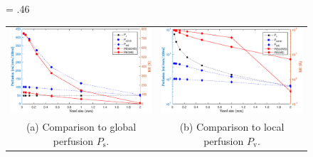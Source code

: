 \documentclass[final,5p,times,twocolumn]{elsarticle}
\begin{document}
    \begin{figure}[]
    	\centering
    	\fwd = .46\textwidth
    	\begin{tabular}{c c}
    		\includegraphics[width=\fwd]{figs/E110_CBFOnDifferentResolutions_plot-Ps-scaleto-none.eps} & \includegraphics[width=\fwd]{figs/E110_CBFOnDifferentResolutions_plot-Pv-scaleto-none.eps}\\	
    		(a) Comparison to global perfusion $P_{\mathrm{s}}$. & (b) Comparison to local perfusion $P_{\mathrm{v}}$. \\
    	\end{tabular}
    	\caption*{}
            \label{fig:volnormperfFIG}
    \end{figure}
\clearpage
\end{document}
